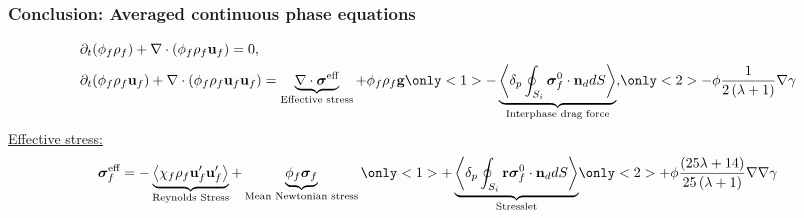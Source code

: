 \documentclass{sintefbeamer}
\begin{document}
\begin{frame}
  \frametitle{Conclusion: Averaged continuous phase equations}
\begin{align*}
  &\pddt (\phi_f \rho_f)  
  + \div (
      \phi_f \rho_f\textbf{u}_f
  )
  = 
  0,\\
  &\pddt (\phi_f \rho_f\textbf{u}_f)
  + \div 
      (\phi_f \rho_f\textbf{u}_f\textbf{u}_f)
  = 
  \underbrace{\div \bm\sigma^\text{eff}}_\text{Effective stress}
  + \phi_f \rho_f \textbf{g} 
  \only<1>{- \underbrace{\pSavg{{\bm{\sigma}_f^0 \cdot \textbf{n}_d}}}_\text{Interphase drag force},}
  \only<2>{- \phi \frac{ 1}{2 \left(\lambda + 1\right)} \grad \gamma}
\end{align*}
\pause
\underline{Effective stress: } 
\begin{equation*}
  \bm{\sigma}_f^\text{eff}
  =
  - \underbrace{\avg{\chi_f\rho_f\textbf{u}_f'\textbf{u}_f'}}_\text{Reynolds Stress}
  + \underbrace{\phi_f \bm{\sigma}_f}_\text{Mean Newtonian stress}%
   \only<1>{+ \underbrace{ {\pSavg{{\textbf{r}\bm{\sigma}_f^0 \cdot \textbf{n}_d}}}}_\text{Stresslet}}
   \only<2>{+ \phi \frac{ \left(25 \lambda + 14\right)}{25 \left(\lambda + 1\right)}
   \grad\grad \gamma}
\end{equation*}


\end{frame}
\end{document}
